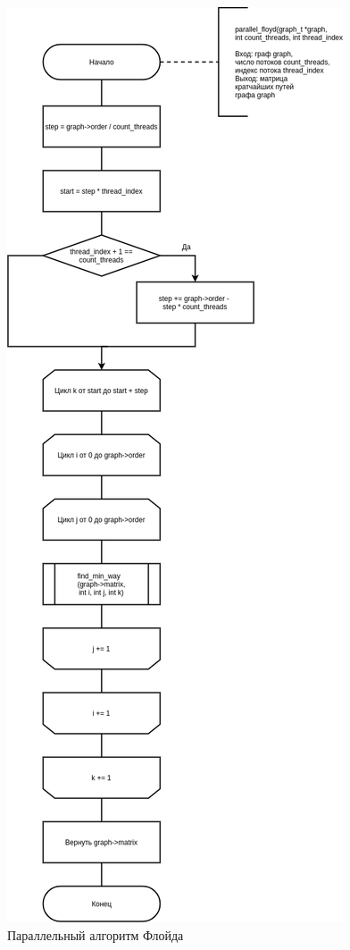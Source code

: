 \begin{figure}[H]
	\begin{center}
		\includegraphics[scale=0.4]{img/parallel.png}
	\end{center}
	\captionsetup{justification=centering}
	\caption{Параллельный алгоритм Флойда}
	\label{img:parallel}
\end{figure}

